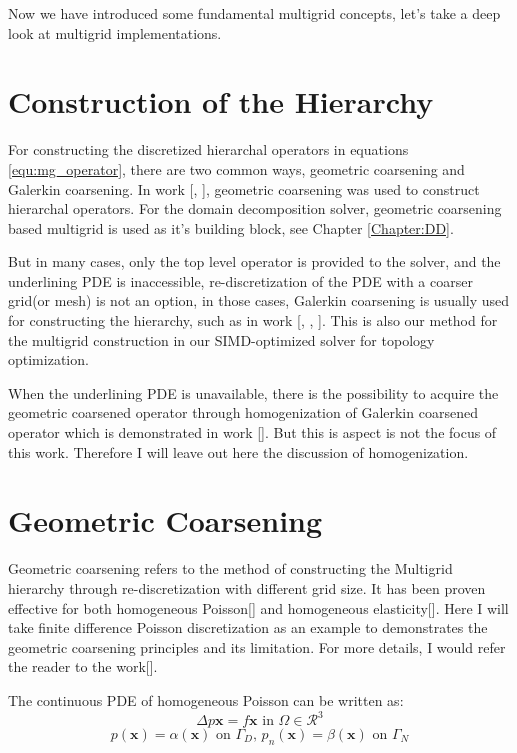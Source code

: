 Now we have introduced some fundamental multigrid concepts, let's take a deep look at multigrid implementations.
\section{Construction of the Hierarchy}
For constructing the discretized hierarchal operators in equations \ref{equ:mg_operator}, there are two common ways, geometric coarsening and Galerkin coarsening. In work [\cite{zhu2010efficient}, \cite{mcadams2010parallel}], geometric coarsening was used to construct hierarchal operators. For the domain decomposition solver, geometric coarsening based multigrid is used as it's building block, see Chapter \ref{Chapter:DD}. 

But in many cases, only the top level operator is provided to the solver, and the underlining PDE is inaccessible, re-discretization of the PDE with a coarser grid(or mesh) is not an option, in those cases, Galerkin coarsening is usually used for constructing the hierarchy, such as in work [\cite{dendy1982black}, \cite{brezina2001algebraic}, \cite{dohrmann2007interpolation}]. This is also our method for the multigrid construction in our SIMD-optimized solver for topology optimization.  

When the underlining PDE is unavailable, there is the possibility to acquire the geometric coarsened operator through homogenization of Galerkin coarsened operator which is demonstrated in work [\cite{moulton1998black}]. But this is aspect is not the focus of this work. Therefore I will leave out here the discussion of homogenization.
\section{Geometric Coarsening}
Geometric coarsening refers to the method of constructing the Multigrid hierarchy through re-discretization with different grid size. It has been proven effective for both homogeneous Poisson[\cite{mcadams2010parallel}] and homogeneous elasticity[\cite{zhu2010efficient}]. Here I will take finite difference Poisson discretization as an example to demonstrates the geometric coarsening principles and its limitation. For more details, I would refer the reader to the work[\cite{mcadams2010parallel}].

The continuous PDE of homogeneous Poisson can be written as:
\begin{equation}
\Delta p\mathbf{x} = f\mathbf{x} \text{ in } \Omega \in \mathcal{R}^3
\end{equation}
$$
p(\mathbf{x}) = \alpha(\mathbf{x}) \text{ on } \Gamma_D\text{, } p_n(\mathbf{x}) = \beta(\mathbf{x}) \text{ on } \Gamma_N
$$


